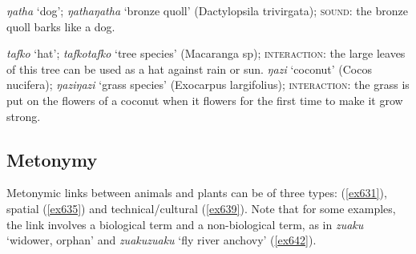 \begin{exe}
	\ex \label{ex645} \emph{ŋatha} `dog'; \emph{ŋathaŋatha} `bronze quoll' (Dactylopsila trivirgata); \textsc{sound:} the bronze quoll barks like a dog.
\end{exe}%
\begin{exe}
\ex \label{ex628}
\begin{xlist}
	\ex \label{ex629} \emph{tafko} `hat'; \emph{tafkotafko} `tree species' (Macaranga sp); \textsc{interaction:} the large leaves of this tree can be used as a hat against rain or sun.
	\ex \label{ex630} \emph{ŋazi} `coconut' (Cocos nucifera); \emph{ŋaziŋazi} `grass species' (Exocarpus largifolius); \textsc{interaction:} the grass is put on the flowers of a coconut when it flowers for the first time to make it grow strong.

\end{xlist}
\end{exe}%

\subsection{Metonymy}\label{redupmetonymy}

Metonymic links between animals and plants can be of three types:  (\ref{ex631}), spatial (\ref{ex635}) and technical/cultural (\ref{ex639}). Note that for some examples, the link involves a biological term and a non-biological term, as in \emph{zuaku} `widower, orphan' and \emph{zuakuzuaku} `fly river anchovy' (\ref{ex642}).

